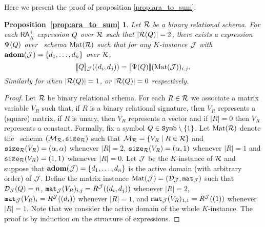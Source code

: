 \newtheorem*{ARATOSUM}{Proposition~\ref{prop:ara_to_sum}}

Here we present the proof of proposition \ref{prop:ara_to_sum}.

\begin{ARATOSUM}
  Let $\mathcal{R}$ be a binary relational schema. For each $\mathsf{RA}_{K}^+$  expression $Q$ over $\mathcal{R}$  such that $|\mathcal{R}(Q)| = 2$, there exists a \langsum  expression $\Psi(Q)$ over \lang \ schema $\text{Mat}(\mathcal{R})$ such that for any $K$-instance $\mathcal{J}$ with $\mathbf{adom}(\mathcal{J}) = \{d_1, \ldots, d_n\}$ over $\mathcal{R}$,
	$$
	\llbracket Q \rrbracket_{\mathcal{J}}((d_i, d_j))=\llbracket \Psi(Q) \rrbracket(\text{Mat}(\mathcal{J}))_{i,j}.
	$$
	Similarly for when $|\mathcal{R}(Q)| = 1$, or $|\mathcal{R}(Q)| = 0$ respectively.
\end{ARATOSUM}

\begin{proof}
Let $\mathcal{R}$ be binary relational schema. For each $R\in \mathcal{R}$ we associate a matrix variable 
$V_R$ such that, if $R$ is a binary relational signature, then $V_R$ represents a (square) matrix, 
if $R$ is unary, then $V_R$ represents a vector and if $|R|=0$ then $V_R$ represents a constant. Formally, 
fix a symbol $Q \in \texttt{Symb} \setminus \{1\}$. Let $\text{Mat}(\mathcal{R})$ denote the \lang \ schema
$(\mathcal{M}_{\mathcal{R}},\texttt{size}_{\mathcal{R}})$ such that $\mathcal{M}_{\mathcal{R}} = \{ V_R \mid R \in \mathcal{R}\}$ and $\texttt{size}_{\mathcal{R}}(V_R) = (\alpha, \alpha)$ 
whenever $|R| = 2$, $\texttt{size}_{\mathcal{R}}(V_R) = (\alpha, 1)$ whenever $|R|=1$ and $\texttt{size}_{\mathcal{R}}(V_R) = (1, 1)$ whenever $|R|=0$. 
Let $\mathcal{J}$ be the $K$-instance of $\mathcal{R}$ and suppose that $\mathbf{adom}(\mathcal{J}) = \{d_1, \ldots, d_n\}$ is 
the active domain (with arbitrary order) of $\mathcal{J}$. 
Define the matrix instance $\text{Mat}(\mathcal{J}) = (\mathcal{D}_{\mathcal{J}},\texttt{mat}_{\mathcal{J}})$ such 
that $\mathcal{D}_{\mathcal{J}}(Q) = n$, $\texttt{mat}_{\mathcal{J}}(V_R)_{i,j} = R^{\mathcal{J}}((d_i, d_j))$ whenever $|R|=2$, $\texttt{mat}_{\mathcal{J}}(V_R)_{i} = R^{\mathcal{J}}((d_i))$ 
whenever $|R|=1$, 
and $\texttt{mat}_{\mathcal{J}}(V_R)_{1,1} = R^{\mathcal{J}}((1))$ whenever $|R|=1$. 
Note that we consider the active domain of the whole $K$-instance.
The proof is by induction on the structure of expressions.



\end{proof}
